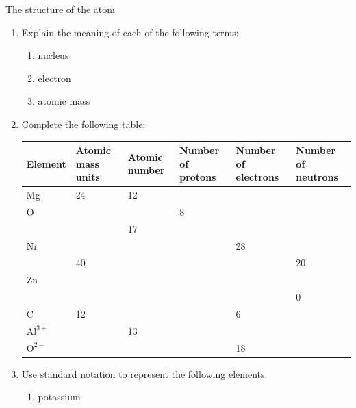 \begin{exercises}{The structure of the atom} \noindent \nopagebreak \vspace{-1cm}
      \label{m38745*id256225}\begin{enumerate}[noitemsep, label=\textbf{\arabic*}. ] 
            \label{m38745*uid15}\item Explain the meaning of each of the following terms:
\label{m38745*id256240}\begin{enumerate}[noitemsep, label=\textbf{\alph*}. ] 
            \label{m38745*uid16}\item nucleus
\label{m38745*uid17}\item electron
\label{m38745*uid18}\item atomic mass
\end{enumerate}
                \label{m38745*uid19}\item Complete the following table:
\begin{center} 
\begin{tabular}{|p{1.4cm}|p{1.4cm}|p{1.4cm}|p{2cm}|p{2cm}|p{2cm}|}\hline
\textbf{Element} & \textbf{Atomic mass units} & \textbf{Atomic number} & \textbf{Number of protons} & \textbf{Number of electrons} & \textbf{Number of neutrons}\\\hline
Mg & 24 & 12 & & & \\\hline
O & & & 8 & & \\\hline
 & & 17 & & & \\\hline
Ni & & & & 28 & \\\hline
 & 40 & & & & 20 \\\hline
Zn & & & & & \\\hline
 & & & & & 0 \\\hline
C & 12 & & & 6 & \\\hline 
$\text{Al}^{3+}$ &  & 13 & & &  \\ \hline
$\text{O}^{2-}$ & & & & 18 &  \\ \hline
\end{tabular}
\end{center}
    \par
          \label{m38745*uid20}\item Use standard notation to represent the following elements:
\label{m38745*id256772}\begin{enumerate}[noitemsep, label=\textbf{\alph*}. ] 
            \label{m38745*uid21}\item potassium

\end{enumerate}
\end{enumerate}
\end{exercises}
